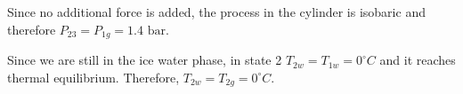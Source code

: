 Since no additional force is added, the process in the cylinder is isobaric and therefore \( P_{23} = P_{1g} = 1.4 \text{ bar} \).

Since we are still in the ice water phase, in state 2 \( T_{2w} = T_{1w} = 0^\circ C \) and it reaches thermal equilibrium. Therefore, \( T_{2w} = T_{2g} = 0^\circ C \).
